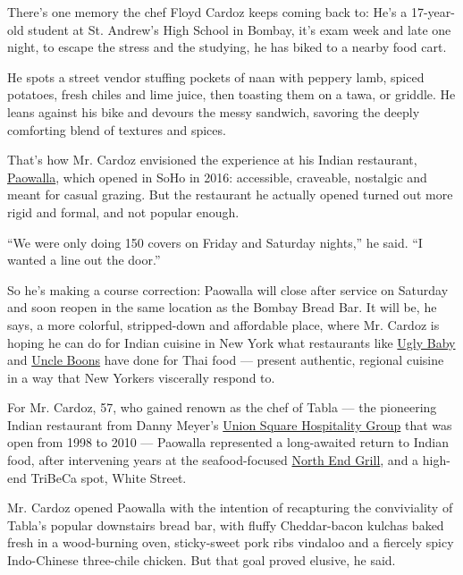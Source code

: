 There's one memory the chef Floyd Cardoz keeps coming back to: He's a
17-year-old student at St. Andrew's High School in Bombay, it's exam
week and late one night, to escape the stress and the studying, he has
biked to a nearby food cart.

He spots a street vendor stuffing pockets of naan with peppery lamb,
spiced potatoes, fresh chiles and lime juice, then toasting them on a
tawa, or griddle. He leans against his bike and devours the messy
sandwich, savoring the deeply comforting blend of textures and spices.

That's how Mr. Cardoz envisioned the experience at his Indian
restaurant,
\href{https://www.nytimes3xbfgragh.onion/2016/11/09/dining/paowalla-review.html}{Paowalla},
which opened in SoHo in 2016: accessible, craveable, nostalgic and meant
for casual grazing. But the restaurant he actually opened turned out
more rigid and formal, and not popular enough.

``We were only doing 150 covers on Friday and Saturday nights,'' he
said. ``I wanted a line out the door.''

So he's making a course correction: Paowalla will close after service on
Saturday and soon reopen in the same location as the Bombay Bread Bar.
It will be, he says, a more colorful, stripped-down and affordable
place, where Mr. Cardoz is hoping he can do for Indian cuisine in New
York what restaurants like
\href{https://www.nytimes3xbfgragh.onion/2017/11/28/dining/ugly-baby-review-thai-brooklyn.html}{Ugly
Baby} and
\href{http://www.nytimes3xbfgragh.onion/2013/07/03/dining/reviews/restaurant-review-uncle-boons-in-nolita.html}{Uncle
Boons} have done for Thai food --- present authentic, regional cuisine
in a way that New Yorkers viscerally respond to.

For Mr. Cardoz, 57, who gained renown as the chef of Tabla --- the
pioneering Indian restaurant from Danny Meyer's
\href{https://www.ushgnyc.com/}{Union Square Hospitality Group} that was
open from 1998 to 2010 --- Paowalla represented a long-awaited return to
Indian food, after intervening years at the seafood-focused
\href{http://www.nytimes3xbfgragh.onion/2012/03/21/dining/reviews/north-end-grill-in-battery-park-city.html}{North
End Grill}, and a high-end TriBeCa spot, White Street.

Mr. Cardoz opened Paowalla with the intention of recapturing the
conviviality of Tabla's popular downstairs bread bar, with fluffy
Cheddar-bacon kulchas baked fresh in a wood-burning oven, sticky-sweet
pork ribs vindaloo and a fiercely spicy Indo-Chinese three-chile
chicken. But that goal proved elusive, he said.

